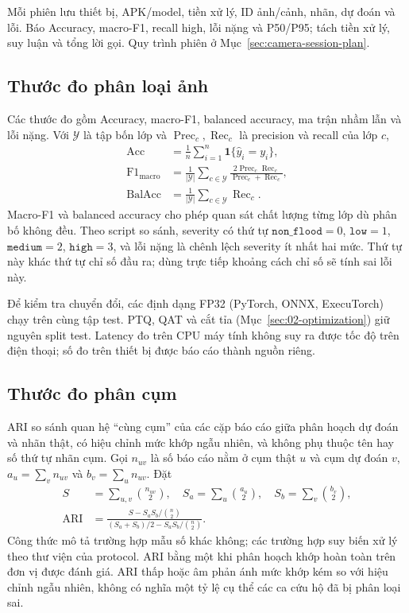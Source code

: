 Mỗi phiên lưu thiết bị, APK/model, tiền xử lý, ID ảnh/cảnh, nhãn, dự đoán và lỗi. Báo Accuracy, macro-F1, recall high, lỗi nặng và P50/P95; tách tiền xử lý, suy luận và tổng lời gọi. Quy trình phiên ở Mục~\ref{sec:camera-session-plan}.

\subsection{Thước đo phân loại ảnh}\label{sec:02-metrics-image}
Các thước đo gồm Accuracy, macro-F1, balanced accuracy, ma trận nhầm lẫn và lỗi nặng. Với $\mathcal Y$ là tập bốn lớp và $\operatorname{Prec}_c,\operatorname{Rec}_c$ là precision và recall của lớp $c$,
\begin{align}
 \operatorname{Acc}&=\frac{1}{n}\sum_{i=1}^{n}\mathbf{1}\{\widehat y_i=y_i\},\nonumber\\
 \operatorname{F1}_{\mathrm{macro}}&=\frac{1}{|\mathcal Y|}\sum_{c\in\mathcal Y}\frac{2\operatorname{Prec}_c\operatorname{Rec}_c}{\operatorname{Prec}_c+\operatorname{Rec}_c},\nonumber\\
 \operatorname{BalAcc}&=\frac{1}{|\mathcal Y|}\sum_{c\in\mathcal Y}\operatorname{Rec}_c.
 \label{eq:image-metrics}
\end{align}
Macro-F1 và balanced accuracy cho phép quan sát chất lượng từng lớp dù phân bố không đều. Theo script so sánh, severity có thứ tự $\texttt{non\_flood}=0$, $\texttt{low}=1$, $\texttt{medium}=2$, $\texttt{high}=3$, và lỗi nặng là chênh lệch severity ít nhất hai mức. Thứ tự này khác thứ tự chỉ số đầu ra; dùng trực tiếp khoảng cách chỉ số sẽ tính sai lỗi này.

Để kiểm tra chuyển đổi, các định dạng FP32 (PyTorch, ONNX, ExecuTorch) chạy trên cùng tập test. PTQ, QAT và cắt tỉa (Mục~\ref{sec:02-optimization}) giữ nguyên split test. Latency đo trên CPU máy tính không suy ra được tốc độ trên điện thoại; số đo trên thiết bị được báo cáo thành nguồn riêng.

\subsection{Thước đo phân cụm}
ARI so sánh quan hệ ``cùng cụm'' của các cặp báo cáo giữa phân hoạch dự đoán và nhãn thật, có hiệu chỉnh mức khớp ngẫu nhiên, và không phụ thuộc tên hay số thứ tự nhãn cụm. Gọi $n_{uv}$ là số báo cáo nằm ở cụm thật $u$ và cụm dự đoán $v$, $a_u=\sum_vn_{uv}$ và $b_v=\sum_un_{uv}$. Đặt
\begin{align}
S&=\sum_{u,v}\binom{n_{uv}}{2},\quad
S_a=\sum_u\binom{a_u}{2},\quad S_b=\sum_v\binom{b_v}{2},\\
\operatorname{ARI}&=\frac{S-S_aS_b/\binom{n}{2}}{(S_a+S_b)/2-S_aS_b/\binom{n}{2}}.
\end{align}
Công thức mô tả trường hợp mẫu số khác không; các trường hợp suy biến xử lý theo thư viện của protocol. ARI bằng một khi phân hoạch khớp hoàn toàn trên đơn vị được đánh giá. ARI thấp hoặc âm phản ánh mức khớp kém so với hiệu chỉnh ngẫu nhiên, không có nghĩa một tỷ lệ cụ thể các ca cứu hộ đã bị phân loại sai.

